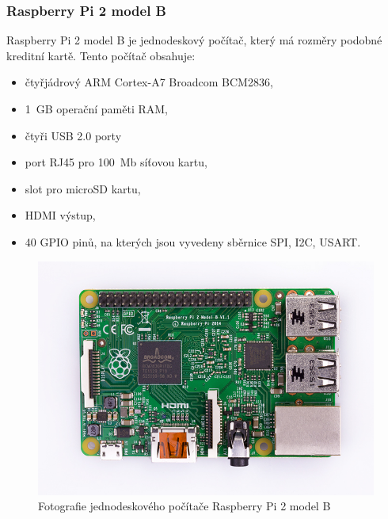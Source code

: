 \documentclass[12pt,a4paper,oneside]{article}
\begin{document}
\subsubsection{Raspberry Pi 2 model B}

Raspberry Pi 2 model B je jednodeskový počítač, který má rozměry podobné kreditní kartě. Tento počítač obsahuje:

\begin{itemize}
	\item čtyřjádrový ARM Cortex-A7 Broadcom BCM2836,
	\item 1~GB operační paměti RAM,
	\item čtyři USB 2.0 porty
	\item port RJ45 pro 100~Mb síťovou kartu,
	\item slot pro microSD kartu,
	\item HDMI výstup,
	\item 40 GPIO pinů, na kterých jsou vyvedeny sběrnice SPI, I2C, USART.
\end{itemize}

\begin{figure}[H]
\centering
\label{fig:foto/rpi2}
\includegraphics[width = 128mm]{img/foto/rpi2.jpg}
\caption{Fotografie jednodeskového počítače Raspberry Pi 2 model B}
\end{figure}
\end{document}
